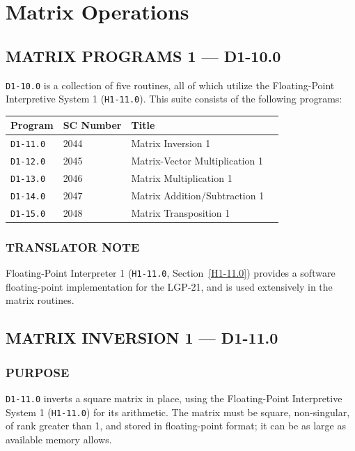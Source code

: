 \section{Matrix Operations}
\label{sec:matrix_operations}

\subsection*{MATRIX PROGRAMS 1 --- D1-10.0}
\label{subsec:matrix_programs_1}

\texttt{D1-10.0} is a collection of five routines, all of which utilize the Floating-Point Interpretive System 1 (\texttt{H1-11.0}). This suite consists of the following programs:

\medskip
\begin{tabular}{llll}
\toprule
\textbf{Program} & \textbf{SC Number} & \textbf{Title} \\
\midrule
\texttt{D1-11.0} & 2044               & Matrix Inversion 1 \\
\texttt{D1-12.0} & 2045               & Matrix-Vector Multiplication 1 \\
\texttt{D1-13.0} & 2046               & Matrix Multiplication 1 \\
\texttt{D1-14.0} & 2047               & Matrix Addition/Subtraction 1 \\
\texttt{D1-15.0} & 2048               & Matrix Transposition 1 \\
\bottomrule
\end{tabular}

\subsubsection*{TRANSLATOR NOTE}
Floating-Point Interpreter 1 (\texttt{H1-11.0}, Section~\ref{H1-11.0}) provides a software floating-point implementation for the LGP-21, and is used extensively in the matrix routines.

\newpage

\subsection*{MATRIX INVERSION 1 --- D1-11.0}
\label{subsec:matrix_inversion_1}

\subsubsection*{PURPOSE}
\texttt{D1-11.0} inverts a square matrix in place, using the Floating-Point Interpretive System 1 (\texttt{H1-11.0}) for its arithmetic. The matrix must be square, non-singular, of rank greater than 1, and stored in floating-point format; it can be as large as available memory allows.

